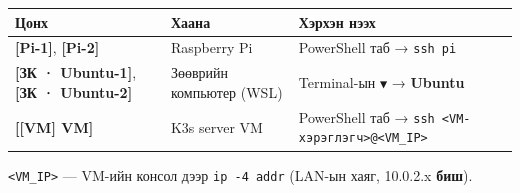 \begingroup\scriptsize\begin{longtable}[]{@{}lll@{}}
\toprule
\begin{minipage}[b]{0.30\columnwidth}\raggedright
Цонх\strut
\end{minipage} & \begin{minipage}[b]{0.30\columnwidth}\raggedright
Хаана\strut
\end{minipage} & \begin{minipage}[b]{0.30\columnwidth}\raggedright
Хэрхэн нээх\strut
\end{minipage}\tabularnewline
\midrule
\endhead
\begin{minipage}[t]{0.30\columnwidth}\raggedright
\textbf{{[}Pi-1{]}}, \textbf{{[}Pi-2{]}}\strut
\end{minipage} & \begin{minipage}[t]{0.30\columnwidth}\raggedright
Raspberry Pi\strut
\end{minipage} & \begin{minipage}[t]{0.30\columnwidth}\raggedright
PowerShell таб → \texttt{ssh\ pi}\strut
\end{minipage}\tabularnewline
\begin{minipage}[t]{0.30\columnwidth}\raggedright
\textbf{{[}ЗК · Ubuntu-1{]}}, \textbf{{[}ЗК · Ubuntu-2{]}}\strut
\end{minipage} & \begin{minipage}[t]{0.30\columnwidth}\raggedright
Зөөврийн компьютер (WSL)\strut
\end{minipage} & \begin{minipage}[t]{0.30\columnwidth}\raggedright
Terminal-ын \texttt{▼} → \textbf{Ubuntu}\strut
\end{minipage}\tabularnewline
\begin{minipage}[t]{0.30\columnwidth}\raggedright
\textbf{{[}{[}VM{]} VM{]}}\strut
\end{minipage} & \begin{minipage}[t]{0.30\columnwidth}\raggedright
K3s server VM\strut
\end{minipage} & \begin{minipage}[t]{0.30\columnwidth}\raggedright
PowerShell таб → \texttt{ssh\ \textless{}VM-хэрэглэгч\textgreater{}@\textless{}VM\_\allowbreak{}IP\textgreater{}}\strut
\end{minipage}\tabularnewline
\bottomrule
\end{longtable}\endgroup

\texttt{\textless{}VM\_\allowbreak{}IP\textgreater{}} --- VM-ийн консол дээр \texttt{ip\ -4\ addr} (LAN-ын хаяг, 10.0.2.x \textbf{биш}).

